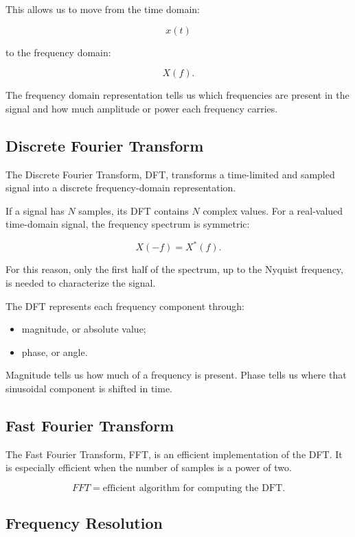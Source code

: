 This allows us to move from the time domain:

\[
x(t)
\]

to the frequency domain:

\[
X(f).
\]

The frequency domain representation tells us which frequencies are present in the signal and how much amplitude or power each frequency carries.

\subsection{Discrete Fourier Transform}

The Discrete Fourier Transform, DFT, transforms a time-limited and sampled signal into a discrete frequency-domain representation.

If a signal has $N$ samples, its DFT contains $N$ complex values. For a real-valued time-domain signal, the frequency spectrum is symmetric:

\[
X(-f)
=
X^*(f).
\]

For this reason, only the first half of the spectrum, up to the Nyquist frequency, is needed to characterize the signal.

The DFT represents each frequency component through:

\begin{itemize}[noitemsep]
    \item magnitude, or absolute value;
    \item phase, or angle.
\end{itemize}

\begin{authornote}
Magnitude tells us how much of a frequency is present. Phase tells us where that sinusoidal component is shifted in time.
\end{authornote}

\subsection{Fast Fourier Transform}

The Fast Fourier Transform, FFT, is an efficient implementation of the DFT. It is especially efficient when the number of samples is a power of two.

\[
FFT = \text{efficient algorithm for computing the DFT}.
\]

\subsection{Frequency Resolution}

